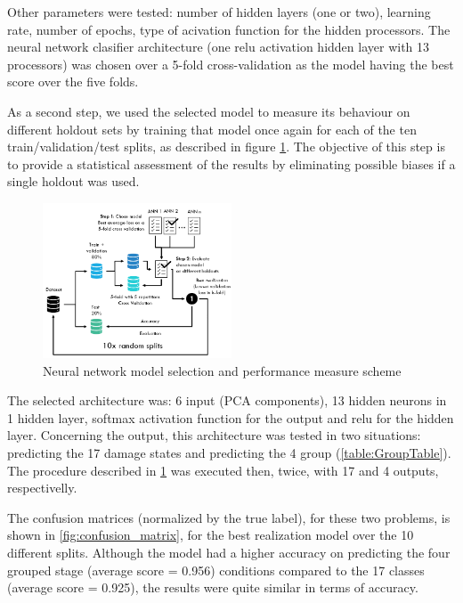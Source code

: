 \documentclass[twocolumn]{article}
\begin{document}
Other parameters were tested: number of hidden layers (one or two), learning rate, number of epochs, type of acivation function for the hidden processors. The neural network clasifier architecture (one relu activation hidden layer with 13 processors) was chosen over a 5-fold cross-validation as the model having the best score over the five folds.


As a second step, we used the selected model to measure its behaviour on different holdout sets by training that model once again for each of the ten train/validation/test splits, as described in figure \ref{fig:ann_protocol}. The objective of this step is to provide a statistical assessment of the results by eliminating possible biases if a single holdout was used.

\begin{figure}[H]
      \centering
      \includegraphics[width=0.5\textwidth]{ann_protocol.png}
      \caption{Neural network model selection and performance measure scheme}
      \label{fig:ann_protocol}
\end{figure}


The selected architecture was: 6 input (PCA components), 13 hidden neurons in 1 hidden layer, softmax activation function for the output and relu for the hidden layer. Concerning the output, this architecture was tested in two situations: predicting the 17 damage states and predicting the 4 group (\ref{table:GroupTable}). The procedure described in \ref{fig:ann_protocol} was executed then, twice, with 17 and 4 outputs, respectivelly.

The confusion matrices (normalized by the true label), for these two problems, is shown in \ref{fig:confusion_matrix}, for the best realization model over the 10 different splits. Although the model had a higher accuracy on predicting the four grouped stage (average score = 0.956) conditions compared to the 17 classes (average score = 0.925), the results were quite similar in terms of accuracy.
\end{document}
